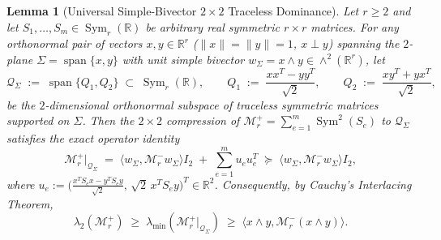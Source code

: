 \documentclass[11pt,a4paper]{article}
\theoremstyle{plain}
\newtheorem{lemma}[theorem]{Lemma}
\theoremstyle{definition}
\theoremstyle{remark}
\DeclareMathOperator{\Sym}{Sym}
\begin{document}
\begin{lemma}[Universal Simple-Bivector $2 \times 2$ Traceless Dominance]\label{lem:simple_bivector}
Let $r \ge 2$ and let $S_1,\dots,S_m \in \Sym_r(\mathbb{R})$ be arbitrary real symmetric $r \times r$ matrices. For any orthonormal pair of vectors $x, y \in \mathbb{R}^r$ ($\|x\| = \|y\| = 1$, $x \perp y$) spanning the $2$-plane $\Sigma = \operatorname{span}\{x,y\}$ with unit simple bivector $w_\Sigma = x \wedge y \in \wedge^2(\mathbb{R}^r)$, let
\[
  \mathcal{Q}_\Sigma \;:=\; \operatorname{span}\big\{Q_1, Q_2\big\} \;\subset\; \Sym_r(\mathbb{R}), \qquad
  Q_1 \;:=\; \frac{x x^T - y y^T}{\sqrt{2}}, \qquad
  Q_2 \;:=\; \frac{x y^T + y x^T}{\sqrt{2}},
\]
be the $2$-dimensional orthonormal subspace of traceless symmetric matrices supported on $\Sigma$. Then the $2 \times 2$ compression of $\mathcal{M}_r^+ = \sum_{e=1}^m \Sym^2(S_e)$ to $\mathcal{Q}_\Sigma$ satisfies the exact operator identity
\begin{equation}\label{eq:QSigma_identity}
  \boxed{\mathcal{M}_r^+\big|_{\mathcal{Q}_\Sigma} \;=\; \big\langle w_\Sigma, \mathcal{M}_r^- w_\Sigma \big\rangle I_2 \;+\; \sum_{e=1}^m u_e u_e^T \;\succeq\; \big\langle w_\Sigma, \mathcal{M}_r^- w_\Sigma \big\rangle I_2,}
\end{equation}
where $u_e := \Big(\frac{x^T S_e x - y^T S_e y}{\sqrt{2}}, \, \sqrt{2}\, x^T S_e y\Big)^T \in \mathbb{R}^2$. Consequently, by Cauchy's Interlacing Theorem,
\begin{equation}\label{eq:lambda2_simple_bivector}
  \lambda_2(\mathcal{M}_r^+) \;\ge\; \lambda_{\min}\!\left(\mathcal{M}_r^+\big|_{\mathcal{Q}_\Sigma}\right) \;\ge\; \big\langle x \wedge y, \mathcal{M}_r^-(x \wedge y) \big\rangle.
\end{equation}
\end{lemma}
\end{document}
